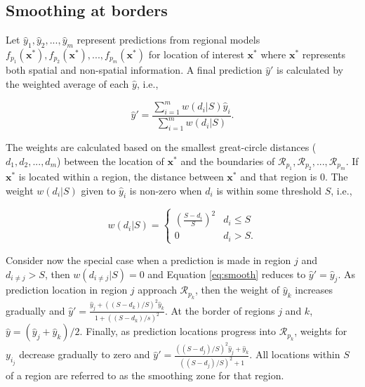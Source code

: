 \subsection{Smoothing at borders}

Let $\hat{y}_{1}, \hat{y}_{2}, ..., \hat{y}_{m}$ represent predictions from regional models $f_{p_1}(\pmb{x}^*), f_{p_2}(\pmb{x}^*), ..., f_{p_m}(\pmb{x}^*)$ for location of interest $\pmb{x}^*$ where $\pmb{x}^*$ represents both spatial and non-spatial information. A final prediction $\hat{y}'$ is calculated by the weighted average of each $\hat{y}$, i.e.,

\begin{equation}
    \hat{y}' = \frac{\sum_{i=1}^m w(d_i|S)\hat{y}_{i}}{\sum_{i=1}^m w(d_i|S)}.
    \label{eq:smooth}
\end{equation}

The weights are calculated based on the smallest great-circle distances ($d_{1}, d_{2}, ..., d_{m}$) between the location of $\pmb{x}^*$ and the boundaries of $\mathcal{R}_{p_1}, \mathcal{R}_{p_2}, ..., \mathcal{R}_{p_m}$. If $\pmb{x}^*$ is located within a region, the distance between $\pmb{x}^*$ and that region is $0$. The weight $w(d_i|S)$ given to $\hat{y}_{i}$ is non-zero when $d_{i}$ is within some threshold $S$, i.e.,

\begin{equation}
    w(d_i | S) = 
    \begin{cases} 
        \left( \frac{S - d_{i}}{S} \right)^2 & d_{i} \leq S\\ 
        0 & d_{i} > S.
    \end{cases}
    \label{eq:weight}
\end{equation}

Consider now the special case when a prediction is made in region $j$ and $d_{i\ne j} > S$, then $w(d_{i \ne j}|S) = 0$ and Equation \ref{eq:smooth} reduces to $\hat{y}' = \hat{y}_{j}$. As prediction location in region $j$ approach $\mathcal{R}_{p_k}$, then the weight of $\hat{y}_{k}$ increases gradually and $\hat{y}' = \frac{ \hat{y}_{j} + \left(\left(S - d_{k}\right)/S\right)^2 \hat{y}_{k}}{1 + \left(\left(S - d_{k}\right)/s\right)^2}$. At the border of regions $j$ and $k$, $\hat{y} = \left(\hat{y}_{j} + \hat{y}_{k}\right) / 2$. Finally, as prediction locations progress into $\mathcal{R}_{p_k}$, weights for $y_{i_j}$ decrease gradually to zero and $\hat{y}' = \frac{\left(\left(S - d_{j}\right)/S\right)^2 \hat{y}_{j} + \hat{y}_{k}}{\left(\left(S - d_{j}\right)/S\right)^2 + 1}$. All locations within $S$ of a region are referred to as the smoothing zone for that region.

